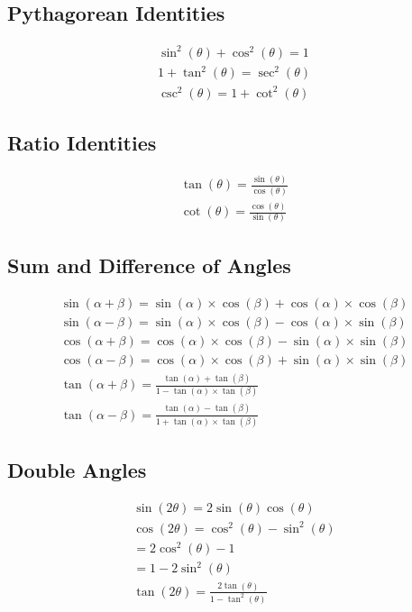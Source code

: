 \documentclass[12pt letter]{report}
\begin{document}
\subsection{Pythagorean Identities}

\begin{align*}
	\sin^2(\theta) + \cos^2(\theta) = 1 \\
	1 + \tan^2(\theta) = \sec^2(\theta) \\
	\csc^2(\theta) = 1 + \cot^2(\theta)
\end{align*}

\subsection{Ratio Identities}
\begin{align*}
	\tan(\theta) = \frac{\sin(\theta)}{\cos(\theta)} \\
	\cot(\theta) = \frac{\cos(\theta)}{\sin(\theta)}
\end{align*}

\subsection{Sum and Difference of Angles}
\begin{align*}
	\sin(\alpha + \beta) = \sin(\alpha) \times \cos(\beta) + \cos(\alpha) \times \cos(\beta)       \\
	\sin(\alpha-\beta) = \sin(\alpha)  \times \cos(\beta) - \cos(\alpha)  \times \sin(\beta)       \\
	\cos(\alpha+\beta) = \cos(\alpha)  \times \cos(\beta) - \sin(\alpha)  \times  \sin(\beta)      \\
	\cos(\alpha - \beta) = \cos(\alpha)  \times \cos(\beta) + \sin(\alpha)  \times  \sin(\beta)    \\
	\tan(\alpha + \beta) = \frac{\tan(\alpha) + \tan(\beta)}{1- \tan(\alpha)  \times  \tan(\beta)} \\
	\tan(\alpha - \beta) = \frac{\tan(\alpha) - \tan(\beta)}{1+ \tan(\alpha)  \times  \tan(\beta)}
\end{align*}

\subsection{Double Angles}
\begin{align*}
	\sin(2\theta) = 2\sin(\theta) \cos(\theta)      \\
	\cos(2\theta) = \cos^2(\theta) - \sin^2(\theta) \\
	= 2\cos^2(\theta) - 1                           \\
	= 1- 2 \sin^2(\theta)                           \\
	\tan(2\theta)= \frac{2\tan(\theta)}{1 - \tan^2(\theta)}
\end{align*}
\end{document}
